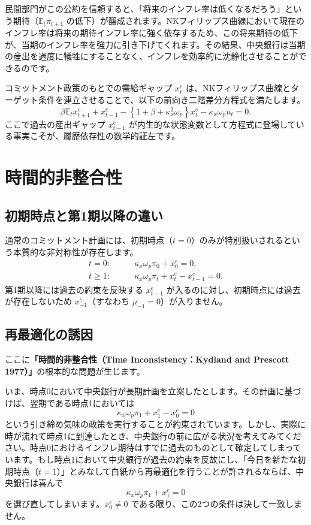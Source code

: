 \documentclass[
  japanese,
  lualatex,
  ja=standard,
  12pt,
  a4paper]{ltjsarticle}
\begin{document}
民間部門がこの公約を信頼すると、「将来のインフレ率は低くなるだろう」という期待（\(\mathbb{E}_t\pi_{t+1}\)
の低下）が醸成されます。NKフィリップス曲線において現在のインフレ率は将来の期待インフレ率に強く依存するため、この将来期待の低下が、当期のインフレ率を強力に引き下げてくれます。その結果、中央銀行は当期の産出を過度に犠牲にすることなく、インフレを効率的に沈静化させることができるのです。

コミットメント政策のもとでの需給ギャップ \(x_t^e\)
は、NKフィリップス曲線とターゲット条件を連立させることで、以下の前向き二階差分方程式を満たします。
\[
\beta\mathbb{E}_t x_{t+1}^e
+x_{t-1}^e
-
\left\{
1+\beta+\kappa_x^2\omega_p
\right\}x_t^e
-\kappa_x\omega_p u_t=0.
\] ここで過去の産出ギャップ \(x_{t-1}^e\)
が内生的な状態変数として方程式に登場している事実こそが、履歴依存性の数学的証左です。

\section{時間的非整合性}\label{ux6642ux9593ux7684ux975eux6574ux5408ux6027}

\subsection{初期時点と第1期以降の違い}\label{ux521dux671fux6642ux70b9ux3068ux7b2c1ux671fux4ee5ux964dux306eux9055ux3044}

通常のコミットメント計画には、初期時点（\(t=0\)）のみが特別扱いされるという本質的な非対称性が存在します。
\[
\begin{aligned}
t=0:
\qquad
&\kappa_x\omega_p\pi_0+x_0^e=0,\\
t\geq1:
\qquad
&\kappa_x\omega_p\pi_t+x_t^e-x_{t-1}^e=0.
\end{aligned}
\] 第1期以降には過去の約束を反映する \(x_{t-1}^e\)
が入るのに対し、初期時点には過去が存在しないため \(x_{-1}^e\)（すなわち
\(\mu_{-1}=0\)）が入りません。

\subsection{再最適化の誘因}\label{ux518dux6700ux9069ux5316ux306eux8a98ux56e0}

ここに\textbf{「時間的非整合性（Time Inconsistency：Kydland and Prescott
1977）」}の根本的な問題が生じます。

いま、時点0において中央銀行が長期計画を立案したとします。その計画に基づけば、翌期である時点1においては
\[
\kappa_x\omega_p\pi_1+x_1^e-x_0^e=0
\]
という引き締め気味の政策を実行することが約束されています。しかし、実際に時が流れて時点1に到達したとき、中央銀行の前に広がる状況を考えてみてください。時点0におけるインフレ期待はすでに過去のものとして確定してしまっています。もし時点1において中央銀行が過去の約束を反故にし、「今日を新たな初期時点（\(t=1\)）」とみなして白紙から再最適化を行うことが許されるならば、中央銀行は喜んで
\[
\kappa_x\omega_p\pi_1+x_1^e=0
\] を選び直してしまいます。\(x_0^e \neq 0\)
である限り、この2つの条件は決して一致しません。
\end{document}

